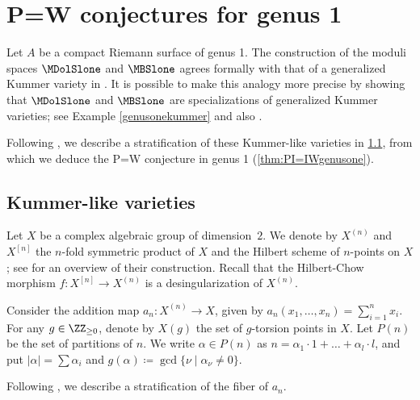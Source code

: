 \section{P=W conjectures for genus 1}\label{sec:P=W1}
Let $A$ be a compact Riemann surface of genus 1.
The construction of the moduli spaces $\MDolSlone$ and $\MBSlone$ agrees formally with that of a generalized Kummer variety in \cite[\S 7]{Beauville84}. It is possible to make this analogy more precise by showing that $\MDolSlone$ and $\MBSlone$ are specializations of generalized Kummer varieties; see Example \ref{genusonekummer} and also \cite[\S 5.3]{MMS}.

Following \cite{GottscheSoergel93}, we describe a stratification of these Kummer-like varieties in \cref{sec:VarietiesKummertype}, from which we deduce the P=W conjecture in genus 1 (\cref{thm:PI=IWgenusone}).

\subsection{Kummer-like varieties}\label{sec:VarietiesKummertype}
Let $X$ be a complex algebraic group of dimension~$2$. We denote by $X^{(n)}$ and $X^{[n]}$ the $n$-fold symmetric product of $X$ and the Hilbert scheme of $n$-points on $X$; see \cite[\S 6]{Beauville84} for an overview of their construction. Recall that the Hilbert-Chow morphism $f\colon X^{[n]} \to X^{(n)}$ is a desingularization of $X^{(n)}$.

\Changel{}
Consider the addition map $a_n\colon X^{(n)} \to X$, given by $a_n(x_1, \ldots, x_n)= \sum_{i=1}^{n}x_i$. For any $g \in \ZZ_{\geq 0}$, denote by $X(g)$ the set of $g$-torsion points in $X$. Let $P(n)$ be the set of partitions of $n$. We write $\alpha \in P(n)$ as $n=\alpha_1 \cdot 1 + \ldots + \alpha_l \cdot l$, and put $|\alpha|= \sum \alpha_i$ and $g(\alpha)\coloneqq \gcd\{\nu\mid\alpha_{\nu}\neq 0 \}$.

Following \cite{GottscheSoergel93}, we describe a stratification of the fiber of $a_n$.


